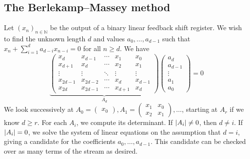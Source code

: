 \subsection{The Berlekamp--Massey method}
Let \( (x_n)_{n \in \mathbb N} \) be the output of a binary linear feedback shift register.
We wish to find the unknown length \( d \) and values \( a_0, \dots, a_{d-1} \) such that \( x_n + \sum_{i=1}^d a_{d-i} x_{n-i} = 0 \) for all \( n \geq d \).
We have
\[ \underbrace{\begin{pmatrix}
    x_d & x_{d-1} & \cdots & x_1 & x_0 \\
    x_{d+1} & x_d & \cdots & x_2 & x_1 \\
    \vdots & \vdots & \ddots & \vdots & \vdots \\
    x_{2d-1} & x_{2d-2} & \cdots & x_d & x_{d-1} \\
    x_{2d} & x_{2d-1} & \cdots & x_{d+1} & x_d
\end{pmatrix}}_{A_d} \begin{pmatrix}
    a_d \\
    a_{d-1} \\
    \vdots \\
    a_1 \\
    a_0
\end{pmatrix} = 0 \]
We look successively at \( A_0 = \begin{pmatrix}
    x_0
\end{pmatrix}, A_1 = \begin{pmatrix}
    x_1 & x_0 \\
    x_2 & x_1
\end{pmatrix}, \dots \), starting at \( A_r \) if we know \( d \geq r \).
For each \( A_i \), we compute its determinant.
If \( \abs{A_i} \neq 0 \), then \( d \neq i \).
If \( \abs{A_i} = 0 \), we solve the system of linear equations on the assumption that \( d = i \), giving a candidate for the coefficients \( a_0, \dots, a_{d-1} \).
This candidate can be checked over as many terms of the stream as desired.
